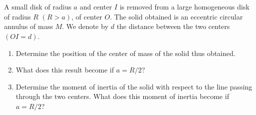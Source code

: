 \documentclass[12pt]{article}
\begin{document}
\section{}

A small disk of radius $a$ and center $I$ is removed from a large homogeneous disk of radius $R$ $(R > a)$, of center $O$. The solid obtained is an eccentric circular annulus of mass $M$. We denote by $d$ the distance between the two centers $(OI = d)$.

\begin{enumerate}
    \item Determine the position of the center of mass of the solid thus obtained.
    \item What does this result become if $a = R/2$?
    \item Determine the moment of inertia of the solid with respect to the line passing through the two centers. What does this moment of inertia become if $a = R/2$?
\end{enumerate}
\end{document}
